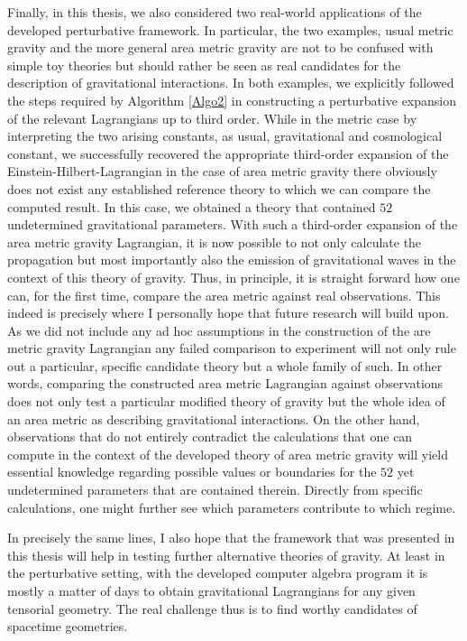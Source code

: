 Finally, in this thesis, we also considered two real-world applications of the developed perturbative framework. In particular, the two examples, usual metric gravity and the more general area metric gravity are not to be confused with simple toy theories but should rather be seen as real candidates for the description of gravitational interactions. In both examples, we explicitly followed the steps required by Algorithm \ref{Algo2} in constructing a perturbative expansion of the relevant Lagrangians up to third order. While in the metric case by interpreting the two arising constants, as usual, gravitational and cosmological constant, we successfully recovered the appropriate third-order expansion of the Einstein-Hilbert-Lagrangian in the case of area metric gravity there obviously does not exist any established reference theory to which we can compare the computed result. In this case, we obtained a theory that contained $52$ undetermined gravitational parameters. 
With such a third-order expansion of the area metric gravity Lagrangian, it is now possible to not only calculate the propagation but most importantly also the emission of gravitational waves in the context of this theory of gravity. Thus, in principle, it is straight forward how one can, for the first time, compare the area metric against real observations. This indeed is precisely where I personally hope that future research will build upon. 
As we did not include any ad hoc assumptions in the construction of the are metric gravity Lagrangian any failed comparison to experiment will not only rule out a particular, specific candidate theory but a whole family of such. In other words, comparing the constructed area metric Lagrangian against observations does not only test a particular modified theory of gravity but the whole idea of an area metric as describing gravitational interactions. 
On the other hand, observations that do not entirely contradict the calculations that one can compute in the context of the developed theory of area metric gravity will yield essential knowledge regarding possible values or boundaries for the $52$ yet undetermined parameters that are contained therein. 
Directly from specific calculations, one might further see which parameters contribute to which regime. 

In precisely the same lines, I also hope that the framework that was presented in this thesis will help in testing further alternative theories of gravity. At least in the perturbative setting, with the developed computer algebra program it is mostly a matter of days to obtain gravitational Lagrangians for any given tensorial geometry. The real challenge thus is to find worthy candidates of spacetime geometries. 

